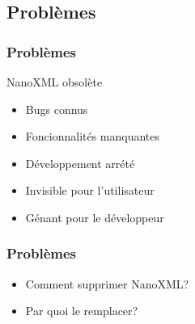 \subsection{Problèmes}
\begin{frame}\frametitle{Problèmes}
	\begin{beamerboxesrounded}[shadow=true]{NanoXML obsolète}
		\begin{itemize}
		\item Bugs connus
		\item Foncionnalités manquantes
		\item Développement arrété
		\end{itemize}
	\end{beamerboxesrounded}
	\begin{itemize}
		\item Invisible pour l'utilisateur
		\item Génant pour le développeur	
	\end{itemize}
\end{frame}
\begin{frame}\frametitle{Problèmes}
\begin{itemize}
	\item Comment supprimer NanoXML?
	\item Par quoi le remplacer?
\end{itemize}
\end{frame}
